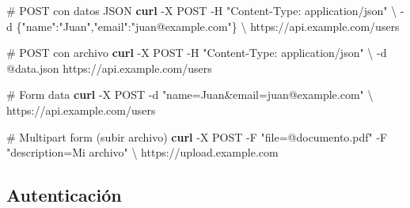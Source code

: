 \documentclass[
  11pt,
  letterpaper,
  oneside,
  openany]{scrbook}
\newenvironment{Shaded}{}{}
\newcommand{\AttributeTok}[1]{\textcolor[rgb]{0.84,0.23,0.29}{#1}}
\newcommand{\CommentTok}[1]{\textcolor[rgb]{0.42,0.45,0.49}{#1}}
\newcommand{\DataTypeTok}[1]{\textcolor[rgb]{0.84,0.23,0.29}{#1}}
\newcommand{\ExtensionTok}[1]{\textcolor[rgb]{0.84,0.23,0.29}{\textbf{#1}}}
\newcommand{\FunctionTok}[1]{\textcolor[rgb]{0.44,0.26,0.76}{#1}}
\newcommand{\NormalTok}[1]{\textcolor[rgb]{0.14,0.16,0.18}{#1}}
\newcommand{\StringTok}[1]{\textcolor[rgb]{0.01,0.18,0.38}{#1}}
\newcommand{\VariableTok}[1]{\textcolor[rgb]{0.89,0.38,0.04}{#1}}
\begin{document}
\begin{Shaded}
\begin{Highlighting}[]
\CommentTok{\# POST con datos JSON}
\ExtensionTok{curl} \AttributeTok{{-}X}\NormalTok{ POST }\AttributeTok{{-}H} \StringTok{"Content{-}Type: application/json"} \DataTypeTok{\textbackslash{}}
     \AttributeTok{{-}d} \StringTok{\textquotesingle{}\{"name":"Juan","email":"juan@example.com"\}\textquotesingle{}} \DataTypeTok{\textbackslash{}}
\NormalTok{     https://api.example.com/users}

\CommentTok{\# POST con archivo}
\ExtensionTok{curl} \AttributeTok{{-}X}\NormalTok{ POST }\AttributeTok{{-}H} \StringTok{"Content{-}Type: application/json"} \DataTypeTok{\textbackslash{}}
     \AttributeTok{{-}d}\NormalTok{ @data.json https://api.example.com/users}

\CommentTok{\# Form data}
\ExtensionTok{curl} \AttributeTok{{-}X}\NormalTok{ POST }\AttributeTok{{-}d} \StringTok{"name=Juan\&email=juan@example.com"} \DataTypeTok{\textbackslash{}}
\NormalTok{     https://api.example.com/users}

\CommentTok{\# Multipart form (subir archivo)}
\ExtensionTok{curl} \AttributeTok{{-}X}\NormalTok{ POST }\AttributeTok{{-}F} \StringTok{"file=@documento.pdf"} \AttributeTok{{-}F} \StringTok{"description=Mi archivo"} \DataTypeTok{\textbackslash{}}
\NormalTok{     https://upload.example.com}
\end{Highlighting}
\end{Shaded}

\subsection{Autenticación}\label{autenticaciuxf3n-1}

\begin{Shaded}
\end{Shaded}
\end{document}
